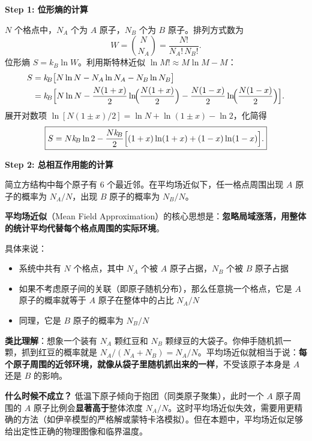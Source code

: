 \begin{derivationbox}[标准解题过程]
\textbf{Step 1: 位形熵的计算}

$N$ 个格点中，$N_A$ 个为 $A$ 原子，$N_B$ 个为 $B$ 原子。排列方式数为
\begin{equation}
W = \binom{N}{N_A} = \frac{N!}{N_A!\,N_B!}.
\end{equation}
位形熵 $S=k_{\!B}\ln W$。利用斯特林近似 $\ln M!\approx M\ln M-M$：
\begin{align}
S &= k_{\!B}\bigl[N\ln N - N_A\ln N_A - N_B\ln N_B\bigr] \notag\\
&= k_{\!B}\Bigl[N\ln N - \frac{N(1+x)}{2}\ln\!\Bigl(\frac{N(1+x)}{2}\Bigr) - \frac{N(1-x)}{2}\ln\!\Bigl(\frac{N(1-x)}{2}\Bigr)\Bigr].
\end{align}
展开对数项 $\ln[N(1\pm x)/2]=\ln N + \ln(1\pm x)-\ln 2$，化简得
\begin{equation}
\boxed{S = Nk_{\!B}\ln 2 - \frac{Nk_{\!B}}{2}\Bigl[(1+x)\ln(1+x) + (1-x)\ln(1-x)\Bigr].}
\end{equation}

\textbf{Step 2: 总相互作用能的计算}

简立方结构中每个原子有 $6$ 个最近邻。在平均场近似下，任一格点周围出现 $A$ 原子的概率为 $N_A/N$，出现 $B$ 原子的概率为 $N_B/N$。

\begin{insightbox}[平均场近似的物理意义]
\textbf{平均场近似}（Mean Field Approximation）的核心思想是：\textbf{忽略局域涨落，用整体的统计平均代替每个格点周围的实际环境}。

具体来说：
\begin{itemize}
    \item 系统中共有 $N$ 个格点，其中 $N_A$ 个被 $A$ 原子占据，$N_B$ 个被 $B$ 原子占据
    \item 如果不考虑原子间的关联（即原子随机分布），那么任意挑一个格点，它是 $A$ 原子的概率就等于 $A$ 原子在整体中的占比 $N_A/N$
    \item 同理，它是 $B$ 原子的概率为 $N_B/N$
\end{itemize}

\textbf{类比理解}：想象一个装有 $N_A$ 颗红豆和 $N_B$ 颗绿豆的大袋子。你伸手随机抓一颗，抓到红豆的概率就是 $N_A/(N_A+N_B) = N_A/N$。平均场近似就相当于说：\textbf{每个原子周围的近邻环境，就像从袋子里随机抓出来的一样}，不受该原子本身是 $A$ 还是 $B$ 的影响。

\textbf{什么时候不成立？} 低温下原子倾向于抱团（同类原子聚集），此时一个 $A$ 原子周围的 $A$ 原子比例会\textbf{显著高于}整体浓度 $N_A/N$。这时平均场近似失效，需要用更精确的方法（如伊辛模型的严格解或蒙特卡洛模拟）。但在本题中，平均场近似足够给出定性正确的物理图像和临界温度。
\end{insightbox}


\end{derivationbox}
